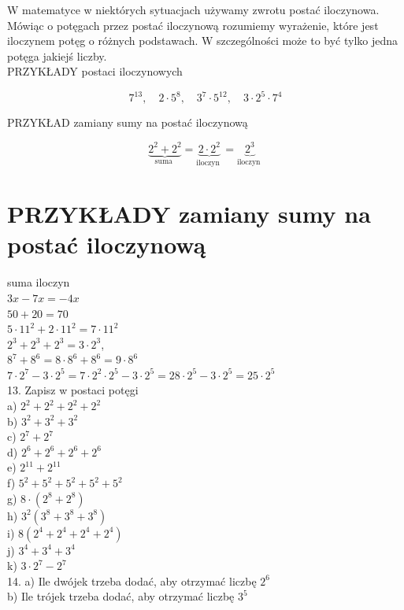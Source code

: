 \documentclass[10pt]{article}
\begin{document}
W matematyce w niektórych sytuacjach używamy zwrotu postać iloczynowa. Mówiąc o potęgach przez postać iloczynową rozumiemy wyrażenie, które jest iloczynem potęg o różnych podstawach. W szczególności może to być tylko jedna potęga jakiejś liczby.\\
PRZYKŁADY postaci iloczynowych

\[
7^{13}, \quad 2 \cdot 5^{8}, \quad 3^{7} \cdot 5^{12}, \quad 3 \cdot 2^{5} \cdot 7^{4}
\]

PRZYKŁAD zamiany sumy na postać iloczynową

\[
\underbrace{2^{2}+2^{2}}_{\text {suma }}=\underbrace{2 \cdot 2^{2}}_{\text {iloczyn }}=\underbrace{2^{3}}_{\text {iloczyn }}
\]

\section*{PRZYKŁADY zamiany sumy na postać iloczynową}
suma iloczyn\\
\(3 x-7 x=-4 x\)\\
\(50+20=70\)\\
\(5 \cdot 11^{2}+2 \cdot 11^{2}=7 \cdot 11^{2}\)\\
\(2^{3}+2^{3}+2^{3}=3 \cdot 2^{3}\),\\
\(8^{7}+8^{6}=8 \cdot 8^{6}+8^{6}=9 \cdot 8^{6}\)\\
\(7 \cdot 2^{7}-3 \cdot 2^{5}=7 \cdot 2^{2} \cdot 2^{5}-3 \cdot 2^{5}=28 \cdot 2^{5}-3 \cdot 2^{5}=25 \cdot 2^{5}\)\\
13. Zapisz w postaci potęgi\\
a) \(2^{2}+2^{2}+2^{2}+2^{2}\)\\
b) \(3^{2}+3^{2}+3^{2}\)\\
c) \(2^{7}+2^{7}\)\\
d) \(2^{6}+2^{6}+2^{6}+2^{6}\)\\
e) \(2^{11}+2^{11}\)\\
f) \(5^{2}+5^{2}+5^{2}+5^{2}+5^{2}\)\\
g) \(8 \cdot\left(2^{8}+2^{8}\right)\)\\
h) \(3^{2}\left(3^{8}+3^{8}+3^{8}\right)\)\\
i) \(8\left(2^{4}+2^{4}+2^{4}+2^{4}\right)\)\\
j) \(3^{4}+3^{4}+3^{4}\)\\
k) \(3 \cdot 2^{7}-2^{7}\)\\
14. a) Ile dwójek trzeba dodać, aby otrzymać liczbę \(2^{6}\)\\
b) Ile trójek trzeba dodać, aby otrzymać liczbę \(3^{5}\)\\
\end{document}
